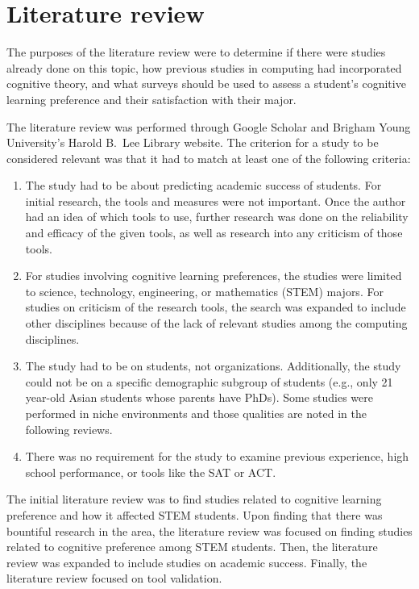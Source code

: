 \chapter{Literature review}\label{chp:chapter2}
The purposes of the literature review were to determine if there were studies already done on this topic, how previous studies in computing had incorporated cognitive theory, and what surveys should be used to assess a student's cognitive learning preference and their satisfaction with their major.

The literature review was performed through Google Scholar and Brigham Young University's Harold B.\ Lee Library website. The criterion for a study to be considered relevant was that it had to match at least one of the following criteria:
\begin{enumerate}
  \item The study had to be about predicting academic success of students. For initial research, the tools and measures were not important. Once the author had an idea of which tools to use, further research was done on the reliability and efficacy of the given tools, as well as research into any criticism of those tools.
  \item For studies involving cognitive learning preferences, the studies were limited to science, technology, engineering, or mathematics (STEM) majors. For studies on criticism of the research tools, the search was expanded to include other disciplines because of the lack of relevant studies among the computing disciplines.
  \item The study had to be on students, not organizations. Additionally, the study could not be on a specific demographic subgroup of students (e.g., only 21 year-old Asian students whose parents have PhDs). Some studies were performed in niche environments and those qualities are noted in the following reviews.
  \item There was no requirement for the study to examine previous experience, high school performance, or tools like the SAT or ACT.
\end{enumerate}

The initial literature review was to find studies related to cognitive learning preference and how it affected STEM students. Upon finding that there was bountiful research in the area, the literature review was focused on finding studies related to cognitive preference among STEM students. Then, the literature review was expanded to include studies on academic success. Finally, the literature review focused on tool validation.

